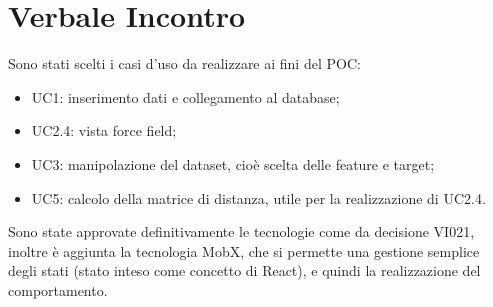 \section{Verbale Incontro}
    Sono stati scelti i casi d'uso da realizzare ai fini del POC:
        \begin{itemize}
            \item UC1: inserimento dati e collegamento al database;
            \item UC2.4: vista force field;
            \item UC3: manipolazione del dataset, cioè scelta delle feature e target;
            \item UC5: calcolo della matrice di distanza, utile per la realizzazione di UC2.4.
        \end{itemize}
        Sono state approvate definitivamente le tecnologie come da decisione VI021, inoltre è aggiunta la tecnologia MobX, che si permette una gestione semplice degli stati (stato inteso come concetto di React), e quindi la realizzazione del comportamento.